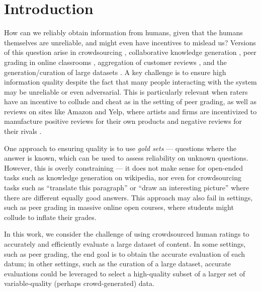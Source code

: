\section{Introduction}
\label{sec:intro}


How can we reliably obtain information from humans, given that the humans 
themselves are unreliable, and might even have incentives to mislead us?
Versions of this question arise in crowdsourcing , 
collaborative knowledge generation , peer grading 
in online classrooms ,  aggregation 
of customer reviews , and the generation/curation of large datasets . A key challenge is to ensure 
high information quality despite the fact that many people interacting with 
the system may be unreliable or even adversarial.
This is particularly relevant when raters have an incentive to collude and 
cheat as in the setting of peer grading, as well as reviews on sites like 
Amazon and Yelp, 
where artists and firms are incentivized to manufacture positive reviews 
for their own products and negative reviews for their rivals .

One approach to ensuring quality is to use \emph{gold sets} --- questions where 
the answer is known, which can be used to assess reliability on unknown questions. 
However, this is overly constraining --- it does not make sense for open-ended 
tasks such as knowledge generation on wikipedia, nor even for crowdsourcing 
tasks such as ``translate this paragraph'' or ``draw an interesting picture'' 
where there are different equally good answers.   This approach may also fail 
in settings, such as %
peer grading in massive online open courses, where 
students might collude to inflate their grades.

In this work, we consider the challenge of using crowdsourced human ratings to accurately and efficiently evaluate a large dataset of content.   In some settings, such as peer grading, the end goal is to obtain the accurate evaluation of each datum; in other settings, such as the curation of a large dataset, accurate evaluations could be leveraged to select a high-quality subset of a larger set of variable-quality (perhaps crowd-generated) data.  

